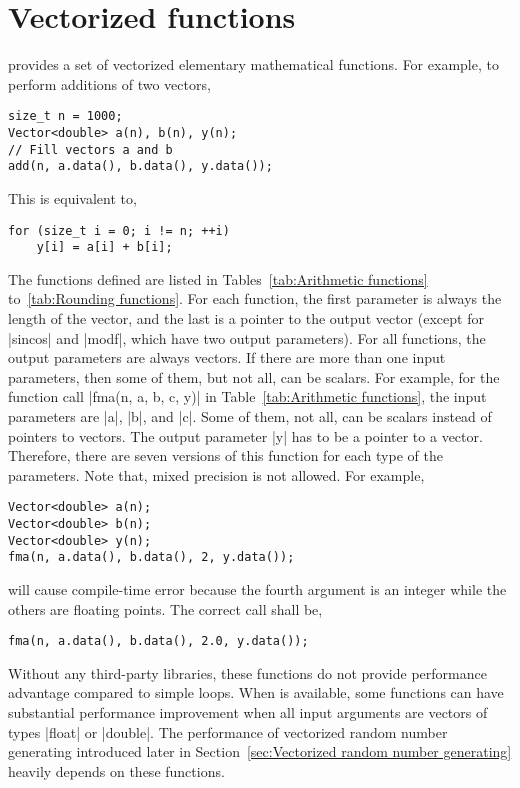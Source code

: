 \section{Vectorized functions}
\label{sec:Vectorized functions}

\mckl provides a set of vectorized elementary mathematical functions. For
example, to perform additions of two vectors,
\begin{Verbatim}
size_t n = 1000;
Vector<double> a(n), b(n), y(n);
// Fill vectors a and b
add(n, a.data(), b.data(), y.data());
\end{Verbatim}
This is equivalent to,
\begin{Verbatim}
for (size_t i = 0; i != n; ++i)
    y[i] = a[i] + b[i];
\end{Verbatim}
The functions defined are listed in Tables~\ref{tab:Arithmetic functions}
to~\ref{tab:Rounding functions}. For each function, the first parameter is
always the length of the vector, and the last is a pointer to the output vector
(except for |sincos| and |modf|, which have two output parameters). For all
functions, the output parameters are always vectors. If there are more than one
input parameters, then some of them, but not all, can be scalars. For example,
for the function call |fma(n, a, b, c, y)| in Table~\ref{tab:Arithmetic
functions}, the input parameters are |a|, |b|, and |c|. Some of them, not all,
can be scalars instead of pointers to vectors. The output parameter |y| has to
be a pointer to a vector. Therefore, there are seven versions of this function
for each type of the parameters. Note that, mixed precision is not allowed. For
example,
\begin{Verbatim}
Vector<double> a(n);
Vector<double> b(n);
Vector<double> y(n);
fma(n, a.data(), b.data(), 2, y.data());
\end{Verbatim}
will cause compile-time error because the fourth argument is an integer while
the others are floating points. The correct call shall be,
\begin{Verbatim}
fma(n, a.data(), b.data(), 2.0, y.data());
\end{Verbatim}
Without any third-party libraries, these functions do not provide performance
advantage compared to simple loops. When \mkl is available, some functions can
have substantial performance improvement when all input arguments are vectors
of types |float| or |double|. The performance of vectorized random number
generating introduced later in Section~\ref{sec:Vectorized random number
generating} heavily depends on these functions.

